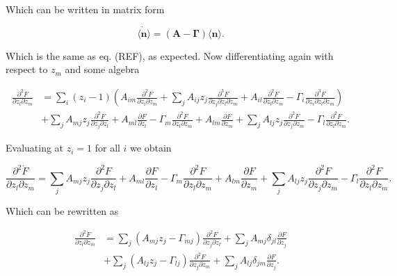 Which can be written in matrix form

\begin{equation}
\dot{\langle \mathbf{n}\rangle} = (\mathbf{A}-\mathbf{\Gamma})\langle \mathbf{n}\rangle.
\end{equation}

Which is the same as  eq. (REF), as expected. Now differentiating again with respect to $z_m$ and some algebra

\begin{equation}
\begin{split}
\frac{\partial^2 \dot{F}}{\partial z_l \partial z_m} &= \sum_i(z_i-1) \left(A_{im}\frac{\partial^2F}{\partial z_i \partial z_m} + \sum_jA_{ij}z_j\frac{\partial^3F}{\partial z_j \partial z_l \partial z_m}+A_{il}\frac{\partial^2F}{\partial z_l\partial z_m} - \Gamma_i\frac{\partial^3F}{\partial z_i \partial z_l \partial z_m}   \right)\\
&+\sum_jA_{mj}z_j\frac{\partial^2F}{\partial z_j\partial z_l}+A_{ml}\frac{\partial F}{\partial z_l} - \Gamma_m\frac{\partial^2F}{\partial z_l\partial z_m} + A_{lm}\frac{\partial F}{\partial z_m} + \sum_jA_{lj}z_j\frac{\partial^2F}{\partial z_j\partial z_m}-\Gamma_l\frac{\partial^2F}{\partial z_l\partial z_m}.
\end{split}
\end{equation}

Evaluating at $z_i=1$ for all $i$ we obtain

\begin{equation}
\frac{\partial^2\dot{F}}{\partial z_l \partial z_m} = \sum_jA_{mj}z_j\frac{\partial^2F}{\partial z_j\partial z_l}+A_{ml}\frac{\partial F}{\partial z_l} - \Gamma_m\frac{\partial^2F}{\partial z_l\partial z_m} + A_{lm}\frac{\partial F}{\partial z_m} + \sum_jA_{lj}z_j\frac{\partial^2F}{\partial z_j\partial z_m}-\Gamma_l\frac{\partial^2F}{\partial z_l\partial z_m}.
\end{equation}

Which can be rewritten as

\begin{equation}
  \begin{split}
    \frac{\partial^2\dot{F}}{\partial z_l \partial z_m} &= \sum_j\left(A_{mj}z_j-\Gamma_{mj}\right)\frac{\partial^2F}{\partial z_j\partial z_l} + \sum_jA_{mj}\delta_{jl}\frac{\partial F}{\partial z_j}\\
&+\sum_j\left(A_{lj}z_j-\Gamma_{lj}\right)\frac{\partial^2F}{\partial z_j\partial z_m} + \sum_jA_{lj}\delta_{jm}\frac{\partial F}{\partial z_j}.
  \end{split}
\end{equation}

